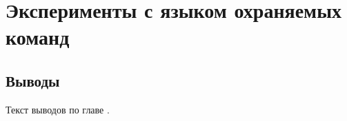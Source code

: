 \chapter{Эксперименты с языком охраняемых команд} \label{ch4}

\section{Выводы} \label{ch4:conclusion}
Текст выводов по главе \thechapter.

%
